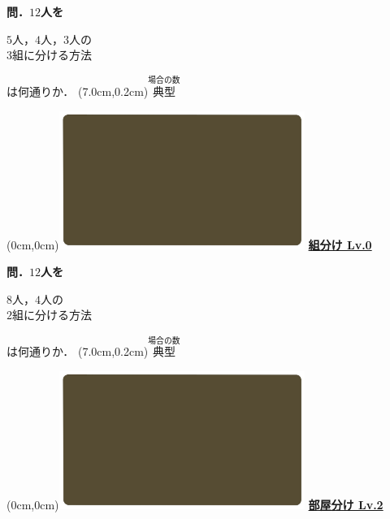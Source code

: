\documentclass[10pt,
fleqn,
dvipdfmx,
uplatex
]{jsarticle}
\begin{document}
\large 
\bf\boldmath 問．${12}$人を

\Huge
\vspace{-0.3zw}
\hspace{0.1zw} $5$人，$4$人，$3$人の\vspace{-0.2zw}\\
\hfill $3$組に分ける方法\hspace{0.1zw} 

\large
\vspace{0.1zw}
\hfill は何通りか．
\at(7.0cm,0.2cm){\small\color{bradorange}$\overset{\text{場合の数}}{\text{典型}}$}

\newpage

\at(0cm,0cm){\includegraphics[width=8cm,bb=0 0 1920 1080]{./youtube/thumbnails/templates/smart_background/場合の数.jpeg}}
{\color{orange}\bf\boldmath\huge\underline{組分け Lv.0 }}\vspace{0.3zw}

\large 
\bf\boldmath 問．${12}$人を

\Huge
\vspace{-0.3zw}
\hspace{0.1zw} $8$人，$4$人の\vspace{-0.2zw}\\
\hfill $2$組に分ける方法\hspace{0.1zw} 

\large
\vspace{0.1zw}
\hfill は何通りか．
\at(7.0cm,0.2cm){\small\color{bradorange}$\overset{\text{場合の数}}{\text{典型}}$}

\newpage

\at(0cm,0cm){\includegraphics[width=8cm,bb=0 0 1920 1080]{./youtube/thumbnails/templates/smart_background/場合の数.jpeg}}
{\color{orange}\bf\boldmath\huge\underline{部屋分け Lv.2 }}\vspace{0.3zw}
\end{document}
